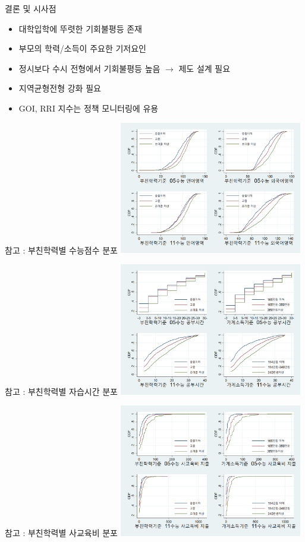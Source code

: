 \documentclass[aspectratio=169,xcolor=dvipsnames,handout]{beamer}
\begin{document}
\begin{frame}{결론 및 시사점}
  \begin{itemize}
    \item 대학입학에 뚜렷한 기회불평등 존재
    \item 부모의 학력/소득이 주요한 기저요인
    \item 정시보다 수시 전형에서 기회불평등 높음 $\rightarrow$ 제도 설계 필요
    \item 지역균형전형 강화 필요
    \item GOI, RRI 지수는 정책 모니터링에 유용
  \end{itemize}
\end{frame}

\begin{frame}{참고 : 부친학력별 수능점수 분포}
  \centering
  \includegraphics[width=0.6\textwidth]{figure/KELS_y56edugrp.png}
\end{frame}

\begin{frame}{참고 : 부친학력별 자습시간 분포}
  \centering
  \includegraphics[width=0.6\textwidth]{figure/KELS_y56hurgrp.png}
\end{frame}

\begin{frame}{참고 : 부친학력별 사교육비 분포}
  \centering
  \includegraphics[width=0.6\textwidth]{figure/KELS_y56pedgrp.png}
\end{frame}
\end{document}
